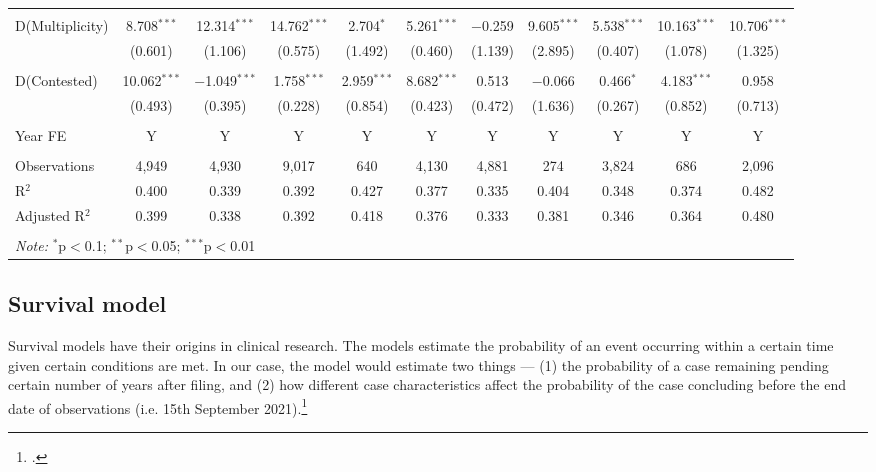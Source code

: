 \begin{landscape}
\begin{table}
{\begin{tabular}{lcccccccccc}
 & & & & & & & & & & \\ 
 D(Multiplicity) & 8.708$^{***}$ & 12.314$^{***}$ & 14.762$^{***}$ & 2.704$^{*}$ & 5.261$^{***}$ & $-$0.259 & 9.605$^{***}$ & 5.538$^{***}$ & 10.163$^{***}$ & 10.706$^{***}$ \\ 
 & (0.601) & (1.106) & (0.575) & (1.492) & (0.460) & (1.139) & (2.895) & (0.407) & (1.078) & (1.325) \\ 
 & & & & & & & & & & \\ 
 D(Contested) & 10.062$^{***}$ & $-$1.049$^{***}$ & 1.758$^{***}$ & 2.959$^{***}$ & 8.682$^{***}$ & 0.513 & $-$0.066 & 0.466$^{*}$ & 4.183$^{***}$ & 0.958 \\ 
 & (0.493) & (0.395) & (0.228) & (0.854) & (0.423) & (0.472) & (1.636) & (0.267) & (0.852) & (0.713) \\ 
 \hline \\[-1.8ex]
 Year FE & Y & Y & Y & Y & Y & Y & Y & Y & Y & Y \\
 \hline \\[-1.8ex] 
 Observations & 4,949 & 4,930 & 9,017 & 640 & 4,130 & 4,881 & 274 & 3,824 & 686 & 2,096 \\ 
 R$^{2}$ & 0.400 & 0.339 & 0.392 & 0.427 & 0.377 & 0.335 & 0.404 & 0.348 & 0.374 & 0.482 \\ 
 Adjusted R$^{2}$ & 0.399 & 0.338 & 0.392 & 0.418 & 0.376 & 0.333 & 0.381 & 0.346 & 0.364 & 0.480 \\ 
 \hline \\[-1.8ex] 
 \multicolumn{11}{l}{\textit{Note:} $^{*}$p$<$0.1; $^{**}$p$<$0.05; $^{***}$p$<$0.01} \\ 
 \end{tabular} }
 \end{table}
\end{landscape}

\subsection{Survival model}
\label{sec:survivalModel}
Survival models have their origins in clinical research. The models estimate the probability of an event occurring within a certain time given certain conditions are met. In our case, the model would estimate two things --- (1) the probability of a case remaining pending certain number of years after filing, and (2) how different case characteristics affect the probability of the case concluding before the end date of observations (i.e. 15th September 2021).\footcite[For a prior example of the use of hazard models for empirical judicial analysis, see][]{datta2017_itatDelays}

